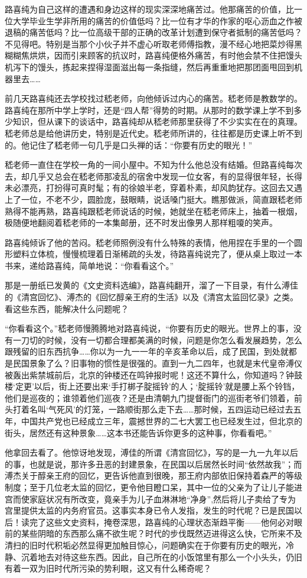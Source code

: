 \par 路喜纯为自己这样的遭遇和身边这样的现实深深地痛苦过。他那痛苦的价值，比一位大学毕业生学非所用的痛苦的价值低吗？比一位有才华的作家的呕心沥血之作被退稿的痛苦低吗？比一位高级干部的正确的改革计划遭到保守者抵制的痛苦低吗？不见得吧。特别是当那个小伙子并不虚心听取老师傅指教，漫不经心地把菜炒得黑糊糊焦烘烘，因而引来顾客的抗议时，路喜纯便格外痛苦，有时他会禁不住把馒头机泻下的馒头，拣起来捏得湿面滋出每一条指缝，然后再重重地把那团面甩回到机器里去……
\par 前几天路喜纯还去学校找过嵇老师，向他倾诉过内心的痛苦。嵇老师是教数学的。路喜纯在那所中学上学时，还是“四人帮”得势的时期。从那时的数学课上学不到多少知识，但从课下的谈话中，路喜纯却从嵇老师那里获得了不少实实在在的真理。嵇老师总是给他讲历史，特别是近代史。嵇老师所讲的，往往都是历史课上听不到的。他记住了嵇老师一句几乎是口头禅的话：“你要有历史的眼光！”
\par 嵇老师一直住在学校一角的一间小屋中。不知为什么他总没有结婚。但路喜纯每次去，却几乎又总会在嵇老师那凌乱的宿舍中发现一位女客，有的显得很年轻，长得未必漂亮，打扮得可真时髦；有的徐娘半老，穿着朴素，却风韵犹存。这回去又遇上了一位，不老不少，圆脸庞，鼓眼睛，说话嗓门挺大。瞧那做派，简直跟嵇老师熟得不能再熟，路喜纯跟嵇老师说话的时候，她就坐在嵇老师床上，抽着一根烟，极随便地翻阅着嵇老师的一本集邮册，还不时发出像男人那样粗嗄的笑声。
\par 路喜纯倾诉了他的苦闷。嵇老师照例没有什么特殊的表情，他用捏在手里的一个圆形塑料立体梳，慢慢梳理着日渐稀疏的头发，待路喜纯说完了，便从桌上取过一本书来，递给路喜纯，简单地说：“你看看这个。”
\par 那是一册纸已发黄的《文史资料选编》，路喜纯翻开，溜了一下目录，有什么溥佳的《清宫回忆》、溥杰的《回忆醇亲王府的生活》以及《清宫太监回忆录》之类。看这些东西，能解决什么问题呢？
\par “你看看这个。”嵇老师慢腾腾地对路喜纯说，“你要有历史的眼光。世界上的事，没有一刀切的时候，没有一切都合理都美满的时候，问题是你怎么看发展趋势，怎么跟残留的旧东西抗争……你以为一九一一年的辛亥革命以后，成了民国，到处就都是民国景象了么？旧事物的惯性是很强的。直到一九二四年，也就是末代皇帝溥仪被轰出紫禁城前后，北京的钟楼还在鸣钟报时呢！这还不算什么，你知道吗？钟鼓楼‘定更’以后，街上还要出来‘手打梆子腚摇铃’的人；‘腚摇铃’就是腰上系个铃铛，他们是巡夜的；谁领着他们巡夜？还是由清朝九门提督衙门的巡街老爷们领着，前头打着名叫‘气死风’的灯笼，一路顺街那么走下去……那时候，五四运动已经过去五年，中国共产党也已经成立三年，震撼世界的二七大罢工也已经发生过，但北京的街头，居然还有这种景象……这本书还能告诉你更多的这种事，你看看吧。”
\par 他拿回去看了。他惊讶地发现，溥佳的所谓《清宫回忆》，写的是一九一九年以后的事，也就是说，那许多丑恶的封建景象，在民国以后居然长时间“依然故我”；而溥杰关于醇亲王府的回忆，更告诉他直到很晚，那王府内部依旧保持着森严的等级制度；至于几位老太监的回忆，更令他目瞪口呆，其中一位的父亲为了让儿子能进宫而使家庭状况有所改变，竟亲手为儿子血淋淋地“净身”,然后将儿子卖给了专为宫里提供太监的内务府官员。这事实本身已令人发指，发生的时代呢？已是民国以后！读完了这些文史资料，掩卷深思，路喜纯的心理状态渐趋平衡——他何必对眼前的某些阴暗的东西那么痛不欲生呢？时代的步伐既然迈进得这么快，它所来不及清扫的旧时代积垢必然显得更加触目惊心，问题确实在于你要有历史的眼光，冷静、沉着地去对待这些东西。因此，自己所在的小饭馆里有那么一个小头头，仍旧有着一双为旧时代所污染的势利眼，这又有什么稀奇呢？
